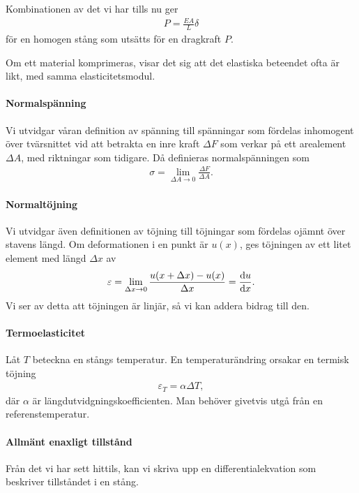 Kombinationen av det vi har tills nu ger
\begin{align*}
	P = \frac{EA}{L}\delta
\end{align*}
för en homogen stång som utsätts för en dragkraft $P$.

Om ett material komprimeras, visar det sig att det elastiska beteendet ofta är likt, med samma elasticitetsmodul.

\paragraph{Normalspänning}
Vi utvidgar våran definition av spänning till spänningar som fördelas inhomogent över tvärsnittet vid att betrakta en inre kraft $\Delta F$ som verkar på ett arealement $\Delta A$, med riktningar som tidigare. Då definieras normalspänningen som
\begin{align*}
	\sigma = \lim\limits_{\Delta A\to 0}\frac{\Delta F}{\Delta A}.
\end{align*}

\paragraph{Normaltöjning}
Vi utvidgar även definitionen av töjning till töjningar som fördelas ojämnt över stavens längd. Om deformationen i en punkt är $u(x)$, ges töjningen av ett litet element med längd $\Delta x$ av
\begin{align*}
	\varepsilon = \lim\limits_{\Delta x\to 0}\frac{u(x + \Delta x) - u(x)}{\Delta x} = \dv{u}{x}.
\end{align*}
Vi ser av detta att töjningen är linjär, så vi kan addera bidrag till den.

\paragraph{Termoelasticitet}
Låt $T$ beteckna en stångs temperatur. En temperaturändring orsakar en termisk töjning
\begin{align*}
	\varepsilon_{T} = \alpha\Delta T,
\end{align*}
där $\alpha$ är längdutvidgningskoefficienten. Man behöver givetvis utgå från en referenstemperatur.

\paragraph{Allmänt enaxligt tillstånd}
Från det vi har sett hittils, kan vi skriva upp en differentialekvation som beskriver tillståndet i en stång.

